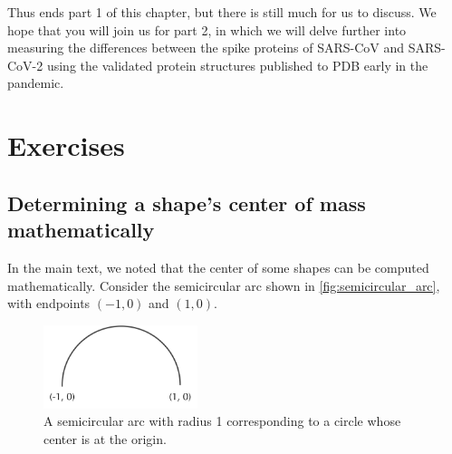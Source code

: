 Thus ends part 1 of this chapter, but there is still much for us to discuss. We hope that you will join us for part 2, in which we will delve further into measuring the differences between the spike proteins of SARS-CoV and SARS-CoV-2 using the validated protein structures published to PDB early in the pandemic.\\

\newpage

\FloatBarrier
{}

\section{Exercises}

\subsection{Determining a shape's center of mass mathematically}

In the main text, we noted that the center of some shapes can be computed mathematically. Consider the semicircular arc shown in \autoref{fig:semicircular_arc}, with endpoints $(-1, 0)$ and $(1, 0)$.\\


\begin{figure}[h]
	\centering
	\mySfFamily
	\includegraphics[width = 0.4\textwidth]{../images/semicircular_arc.png}
	\caption{A semicircular arc with radius 1 corresponding to a circle whose center is at the origin.}
	\label{fig:semicircular_arc}
\end{figure}

\begin{exercise}\end{exercise}

\begin{exercise}\end{exercise}
